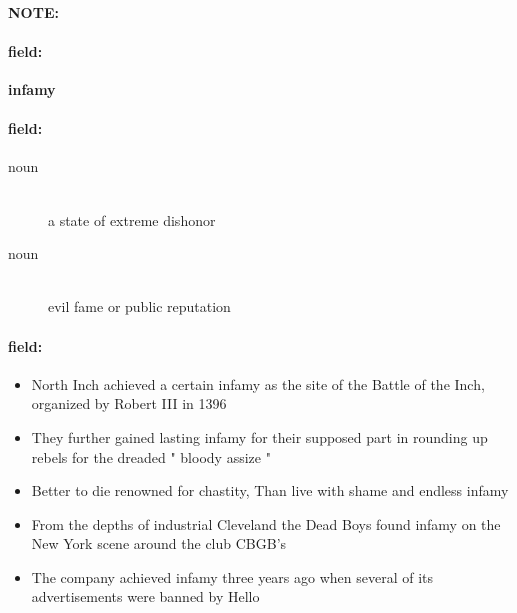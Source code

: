 \documentclass[12pt]{article}
\newenvironment{note}{\paragraph{NOTE:}}{}
\newenvironment{field}{\paragraph{field:}}{}
\begin{document}
\begin{note}
\begin{field}
\textbf{\large infamy}
\end{field}


\begin{field}
\begin{description}
\item[noun] \hfill \\ 
a state of extreme dishonor

\item[noun] \hfill \\ 
evil fame or public reputation

\end{description}
\end{field}

\begin{field}
\begin{itemize}
\item North Inch achieved a certain infamy as the site of the Battle of the Inch, organized by Robert III in 1396
\item They further gained lasting infamy for their supposed part in rounding up rebels for the dreaded " bloody assize " 
\item Better to die renowned for chastity, Than live with shame and endless infamy
\item From the depths of industrial Cleveland the Dead Boys found infamy on the New York scene around the club CBGB's
\item The company achieved infamy three years ago when several of its advertisements were banned by Hello
\end{itemize}
\end{field}
\end{note}
\end{document}
